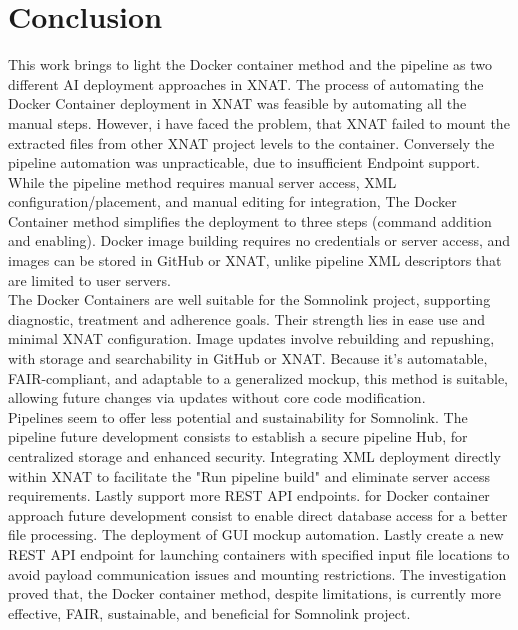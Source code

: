 \chapter{Conclusion}


This work brings to light the Docker container method and the pipeline as two different AI deployment approaches in XNAT. 
The process of automating the Docker Container deployment in XNAT was feasible by automating all the manual steps. However, i have faced the problem, that XNAT failed to mount the extracted files from other XNAT project levels to the container. Conversely the pipeline automation was unpracticable, due to insufficient Endpoint support.   \\
While the pipeline method requires manual server access, XML configuration/placement, and manual editing for integration, The Docker Container method simplifies the deployment to three steps (command addition and enabling). Docker image building requires no credentials or server access, and images can be stored in GitHub or XNAT, unlike pipeline XML descriptors that are limited to user servers.\\
The Docker Containers are well suitable for the Somnolink project, supporting diagnostic, treatment and adherence goals. Their strength lies in ease use and minimal XNAT configuration. Image updates involve rebuilding and repushing, with storage and searchability in GitHub or XNAT. Because it's automatable, FAIR-compliant, and adaptable to a generalized mockup, this method is suitable, allowing future changes via updates without core code modification.\\
Pipelines seem to offer less potential and sustainability for Somnolink.
The pipeline future development consists to establish a secure pipeline Hub, for centralized storage and enhanced security. Integrating XML deployment directly within XNAT to facilitate the "Run pipeline build" and eliminate server access requirements. Lastly support more REST API endpoints.
for Docker container approach future development consist to enable direct database access for a better file processing. The deployment of GUI mockup automation. Lastly create a new REST API endpoint for launching containers with specified input file locations to avoid payload communication issues and mounting restrictions.
The investigation proved that, the Docker container method, despite limitations, is currently more effective, FAIR, sustainable, and beneficial for Somnolink project.



















